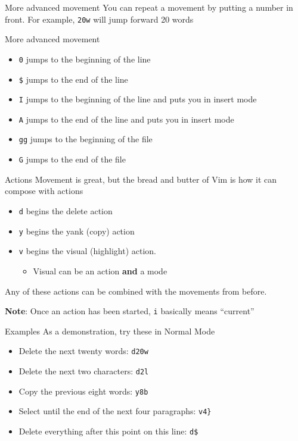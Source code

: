 \documentclass{beamer}
\begin{document}
\begin{frame}{More advanced movement}
	You can repeat a movement by putting a number in front. For example, \texttt{20w} will jump forward 20 words
\end{frame}
\begin{frame}{More advanced movement}
	\begin{itemize}
		\item \texttt{0} jumps to the beginning of the line
		\item \texttt{\$} jumps to the end of the line
		\item \texttt{I} jumps to the beginning of the line and puts you in insert mode
		\item \texttt{A} jumps to the end of the line and puts you in insert mode
		\item \texttt{gg} jumps to the beginning of the file
		\item \texttt{G} jumps to the end of the file
	\end{itemize}
\end{frame}
\begin{frame}{Actions}
	Movement is great, but the bread and butter of Vim is how it can compose with actions
	\begin{itemize}
		\item \texttt{d} begins the delete action
		\item \texttt{y} begins the yank (copy) action
		\item \texttt{v} begins the visual (highlight) action. \begin{itemize}
				\item Visual can be an action \textbf{and} a mode
		\end{itemize}
	\end{itemize}
	Any of these actions can be combined with the movements from before. 

		\textbf{Note}: Once an action has been started, \texttt{i} basically means ``current''

\end{frame}
\begin{frame}{Examples}
	As a demonstration, try these in Normal Mode
	\begin{itemize}	
		\item Delete the next twenty words: \texttt{d20w}
		\item Delete the next two characters: \texttt{d2l}
		\item Copy the previous eight words: \texttt{y8b}
		\item Select until the end of the next four paragraphs: \texttt{v4\}}
		\item Delete everything after this point on this line: \texttt{d\$}
	\end{itemize}
\end{frame}
\end{document}
